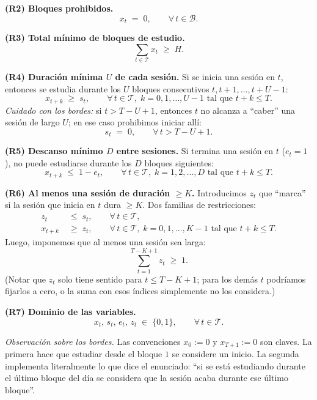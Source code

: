 \documentclass{article}
\begin{document}
\medskip
\noindent\textbf{(R2) Bloques prohibidos.}
\[
x_t \;=\; 0, \qquad \forall\, t\in\mathcal{B}.
\]

\medskip
\noindent\textbf{(R3) Total m\'inimo de bloques de estudio.}
\[
\sum_{t\in\mathcal{T}} x_t \;\geq\; H.
\]

\medskip
\noindent\textbf{(R4) Duraci\'on m\'inima $U$ de cada sesi\'on.} Si se inicia una sesi\'on en $t$, entonces se estudia durante los $U$ bloques consecutivos $t, t+1, \dots, t+U-1$:
\[
x_{t+k} \;\geq\; s_t, \qquad \forall\, t\in\mathcal{T},\; k=0,1,\dots,U-1 \text{ tal que } t+k\leq T.
\]
\emph{Cuidado con los bordes:} si $t>T-U+1$, entonces $t$ no alcanza a ``caber'' una sesi\'on de largo $U$; en ese caso prohibimos iniciar all\'i:
\[
s_t \;=\; 0, \qquad \forall\, t > T-U+1.
\]

\medskip
\noindent\textbf{(R5) Descanso m\'inimo $D$ entre sesiones.} Si termina una sesi\'on en $t$ ($e_t=1$), no puede estudiarse durante los $D$ bloques siguientes:
\[
x_{t+k} \;\leq\; 1 - e_t, \qquad \forall\, t\in\mathcal{T},\; k=1,2,\dots,D \text{ tal que } t+k\leq T.
\]

\medskip
\noindent\textbf{(R6) Al menos una sesi\'on de duraci\'on $\geq K$.} Introducimos $z_t$ que ``marca'' si la sesi\'on que inicia en $t$ dura $\geq K$. Dos familias de restricciones:
\begin{align}
z_t &\;\leq\; s_t, \qquad \forall\, t\in\mathcal{T}, \label{eq:z1}\\
x_{t+k} &\;\geq\; z_t, \qquad \forall\, t\in\mathcal{T},\; k=0,1,\dots,K-1 \text{ tal que } t+k\leq T. \label{eq:z2}
\end{align}
Luego, imponemos que al menos una sesi\'on sea larga:
\[
\sum_{t=1}^{T-K+1} z_t \;\geq\; 1.
\]
(Notar que $z_t$ solo tiene sentido para $t\leq T-K+1$; para los dem\'as $t$ podr\'iamos fijarlos a cero, o la suma con esos \'indices simplemente no los considera.)

\medskip
\noindent\textbf{(R7) Dominio de las variables.}
\[
x_t,\,s_t,\,e_t,\,z_t \;\in\; \{0,1\}, \qquad \forall\, t\in\mathcal{T}.
\]

\medskip

\noindent\emph{Observaci\'on sobre los bordes.} Las convenciones $x_0 := 0$ y $x_{T+1}:=0$ son claves. La primera hace que estudiar desde el bloque $1$ se considere un inicio. La segunda implementa literalmente lo que dice el enunciado: ``si se est\'a estudiando durante el \'ultimo bloque del d\'ia se considera que la sesi\'on acaba durante ese \'ultimo bloque''.
\end{document}
